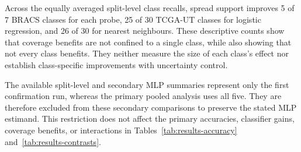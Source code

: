 Across the equally averaged split-level class recalls, spread support improves 5 of 7 BRACS classes for each probe, 25 of 30 TCGA-UT classes for logistic regression, and 26 of 30 for nearest neighbours. These descriptive counts show that coverage benefits are not confined to a single class, while also showing that not every class benefits. They neither measure the size of each class's effect nor establish class-specific improvements with uncertainty control.

The available split-level and secondary MLP summaries represent only the first confirmation run, whereas the primary pooled analysis uses all five. They are therefore excluded from these secondary comparisons to preserve the stated MLP estimand. This restriction does not affect the primary accuracies, classifier gains, coverage benefits, or interactions in Tables~\ref{tab:results-accuracy} and~\ref{tab:results-contrasts}.
